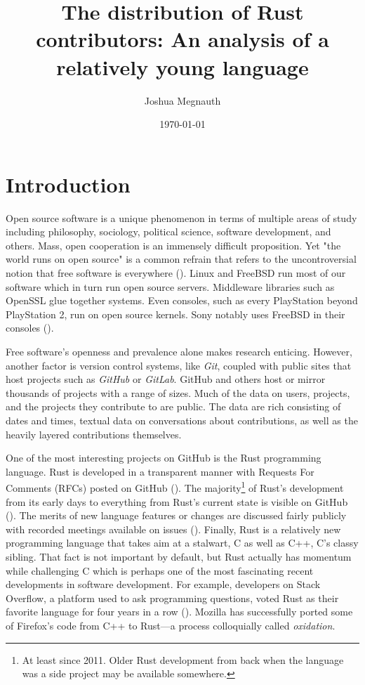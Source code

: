 \documentclass[12pt, a4paper]{article}
\title{The distribution of Rust contributors: An analysis of a relatively young language}
\author{Joshua Megnauth}
\date{\today}
\begin{document}
\maketitle

\section{Introduction}
Open source software is a unique phenomenon in terms of multiple areas of study including philosophy, sociology, political science, software development, and others. Mass, open cooperation is an immensely difficult proposition. Yet "the world runs on open source" is a common refrain that refers to the uncontroversial notion that free software is everywhere (\cite{fossdatasci2020}). Linux and FreeBSD run most of our software which in turn run open source servers. Middleware libraries such as OpenSSL glue together systems. Even consoles, such as every PlayStation beyond PlayStation 2, run on open source kernels. Sony notably uses FreeBSD in their consoles (\cite{ps4freebsd}).

Free software's openness and prevalence alone makes research enticing. However, another factor is version control systems, like \textit{Git}, coupled with public sites that host projects such as \textit{GitHub} or \textit{GitLab}. GitHub and others host or mirror thousands of projects with a range of sizes. Much of the data on users, projects, and the projects they contribute to are public. The data are rich consisting of dates and times, textual data on conversations about contributions, as well as the heavily layered contributions themselves.

One of the most interesting projects on GitHub is the Rust programming language. Rust is developed in a transparent manner with Requests For Comments (RFCs) posted on GitHub (\cite{rustrfcs}). The majority\footnote{At least since 2011. Older Rust development from back when the language was a side project may be available somewhere.} of Rust's development from its early days to everything from Rust's current state is visible on GitHub (\cite{rustlang}). The merits of new language features or changes are discussed fairly publicly with recorded meetings available on issues (\cite{rustteammeets}). Finally, Rust is a relatively new programming language that takes aim at a stalwart, C as well as C++, C's classy sibling. That fact is not important by default, but Rust actually has momentum while challenging C which is perhaps one of the most fascinating recent developments in software development. For example, developers on Stack Overflow, a platform used to ask programming questions, voted Rust as their favorite language for four years in a row (\cite{stackoverflowdevsurvey2020}). Mozilla has successfully ported some of Firefox's code from C++ to Rust---a process colloquially called \textit{oxidation}.
\end{document}
